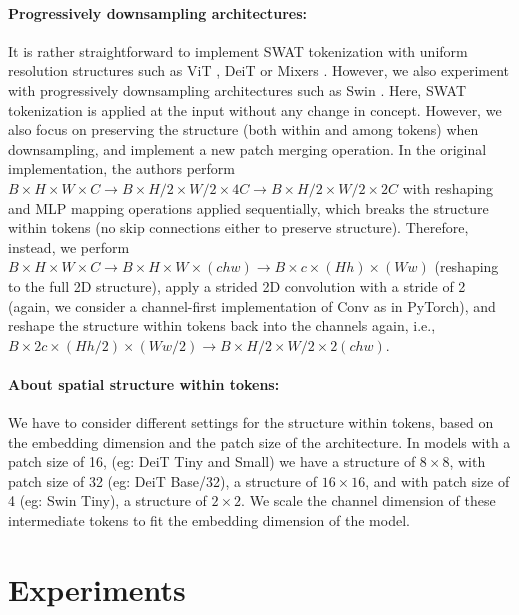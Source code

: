 \documentclass[10pt,twocolumn,letterpaper]{article}
\begin{document}
\paragraph{Progressively downsampling architectures:} It is rather straightforward to implement SWAT tokenization with uniform resolution structures such as ViT \cite{dosovitskiy2020image}, DeiT \cite{touvron2021deit} or Mixers \cite{tolstikhin2021mixer}. However, we also experiment with progressively downsampling architectures such as Swin \cite{liu2021swin}. Here, SWAT tokenization is applied at the input without any change in concept. However, we also focus on preserving the structure (both within and among tokens) when downsampling, and implement a new patch merging operation. In the original implementation, the authors perform 
$B \times H\times W\times C \rightarrow B \times H/2\times W/2\times 4C \rightarrow B \times H/2\times W/2\times 2C$ 
with reshaping and MLP mapping operations applied sequentially, which breaks the structure within tokens (no skip connections either to preserve structure). Therefore, instead, we perform $B \times H\times W\times C \rightarrow B \times H\times W\times (chw) \rightarrow B \times c\times (Hh)\times (Ww)$ (reshaping to the full 2D structure), apply a strided 2D convolution with a stride of 2 (again, we consider a channel-first implementation of Conv as in PyTorch), and reshape the structure within tokens back into the channels again, i.e., $B \times 2c\times (Hh/2)\times (Ww/2) \rightarrow B \times H/2\times W/2\times 2(chw)$.

\paragraph{About spatial structure within tokens:} We have to consider different settings for the structure within tokens, based on the embedding dimension and the patch size of the architecture. In models with a patch size of 16, (eg: DeiT Tiny and Small) we have a structure of $8\times8$, with patch size of 32 (eg: DeiT Base/32), a structure of $16\times16$, and with patch size of 4 (eg: Swin Tiny), a structure of $2\times2$. We scale the channel dimension of these intermediate tokens to fit the embedding dimension of the model.



\section{Experiments}
\label{sec:results}
\end{document}
